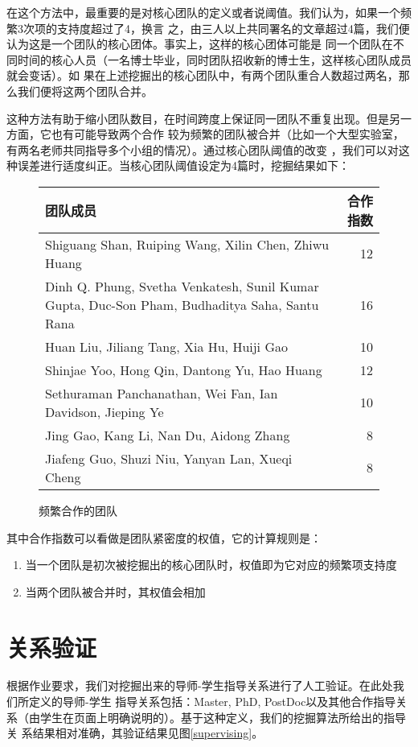 \documentclass[a4paper]{article}
\begin{document}
在这个方法中，最重要的是对核心团队的定义或者说阈值。我们认为，如果一个频繁3次项的支持度超过了4，换言
之，由三人以上共同署名的文章超过4篇，我们便认为这是一个团队的核心团体。事实上，这样的核心团体可能是
同一个团队在不同时间的核心人员（一名博士毕业，同时团队招收新的博士生，这样核心团队成员就会变话）。如
果在上述挖掘出的核心团队中，有两个团队重合人数超过两名，那么我们便将这两个团队合并。

这种方法有助于缩小团队数目，在时间跨度上保证同一团队不重复出现。但是另一方面，它也有可能导致两个合作
较为频繁的团队被合并（比如一个大型实验室，有两名老师共同指导多个小组的情况）。通过核心团队阈值的改变
，我们可以对这种误差进行适度纠正。当核心团队阈值设定为4篇时，挖掘结果如下：


\begin{figure}[ht]
  \begin{center}
    \begin{tabular}{m{12cm}r}
      \hline
      团队成员 & 合作指数 \\
      \hline
      Shiguang Shan, Ruiping Wang, Xilin Chen, Zhiwu Huang & 12 \\
      Dinh Q. Phung, Svetha Venkatesh, Sunil Kumar Gupta, Duc-Son Pham, Budhaditya Saha, Santu Rana
      & 16 \\
      Huan Liu, Jiliang Tang, Xia Hu, Huiji Gao & 10 \\
      Shinjae Yoo, Hong Qin, Dantong Yu, Hao Huang & 12 \\
      Sethuraman Panchanathan, Wei Fan, Ian Davidson, Jieping Ye & 10 \\
      Jing Gao, Kang Li, Nan Du, Aidong Zhang & 8 \\
      Jiafeng Guo, Shuzi Niu, Yanyan Lan, Xueqi Cheng & 8 \\
      \hline
    \end{tabular}
  \end{center}
  \caption{频繁合作的团队}
\end{figure}

其中合作指数可以看做是团队紧密度的权值，它的计算规则是：
\begin{enumerate}
  \item 当一个团队是初次被挖掘出的核心团队时，权值即为它对应的频繁项支持度
  \item 当两个团队被合并时，其权值会相加
\end{enumerate}

\section{关系验证} 
根据作业要求，我们对挖掘出来的导师-学生指导关系进行了人工验证。在此处我们所定义的导师-学生
指导关系包括：Master, PhD,
PostDoc以及其他合作指导关系（由学生在页面上明确说明的）。基于这种定义，我们的挖掘算法所给出的指导关
系结果相对准确，其验证结果见图\ref{supervising}。
\end{document}
